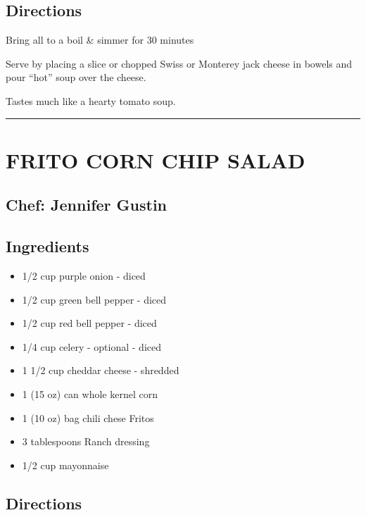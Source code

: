 \documentclass[
]{book}
\providecommand{\tightlist}{%
  \setlength{\itemsep}{0pt}\setlength{\parskip}{0pt}}
\begin{document}
\hypertarget{directions-17}{%
\subsection*{Directions}\label{directions-17}}


Bring all to a boil \& simmer for 30 minutes

Serve by placing a slice or chopped Swiss or Monterey jack cheese in
bowels and pour ``hot'' soup over the cheese.

Tastes much like a hearty tomato soup.

\begin{center}\rule{0.5\linewidth}{0.5pt}\end{center}

\hypertarget{frito-corn-chip-salad}{%
\section*{FRITO CORN CHIP SALAD}\label{frito-corn-chip-salad}}


\hypertarget{chef-jennifer-gustin-4}{%
\subsection*{Chef: Jennifer Gustin}\label{chef-jennifer-gustin-4}}


\hypertarget{ingredients-18}{%
\subsection*{Ingredients}\label{ingredients-18}}


\begin{itemize}
\tightlist
\item
  1/2 cup purple onion - diced
\item
  1/2 cup green bell pepper - diced
\item
  1/2 cup red bell pepper - diced
\item
  1/4 cup celery - optional - diced
\item
  1 1/2 cup cheddar cheese - shredded
\item
  1 (15 oz) can whole kernel corn
\item
  1 (10 oz) bag chili chese Fritos
\item
  3 tablespoons Ranch dressing
\item
  1/2 cup mayonnaise
\end{itemize}

\hypertarget{directions-18}{%
\subsection*{Directions}\label{directions-18}}
\end{document}
